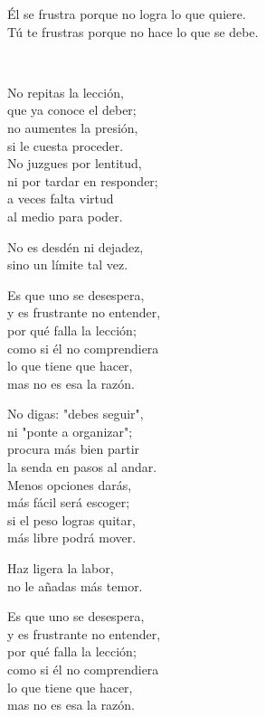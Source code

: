 \begin{lyrics}

Él se frustra porque no logra lo que quiere.\\
Tú te frustras porque no hace lo que se debe.

\\


No repitas la lección,\\
que ya conoce el deber;\\
no aumentes la presión,\\
si le cuesta proceder.\\
No juzgues por lentitud,\\
ni por tardar en responder;\\
a veces falta virtud\\
al medio para poder.


No es desdén ni dejadez,\\
sino un límite tal vez.


Es que uno se desespera,\\
y es frustrante no entender,\\
por qué falla la lección;\\
como si él no comprendiera\\
lo que tiene que hacer,\\
mas no es esa la razón.


No digas: "debes seguir",\\
ni "ponte a organizar";\\
procura más bien partir\\
la senda en pasos al andar.\\
Menos opciones darás,\\
más fácil será escoger;\\
si el peso logras quitar,\\
más libre podrá mover.


Haz ligera la labor,\\
no le añadas más temor.


Es que uno se desespera,\\
y es frustrante no entender,\\
por qué falla la lección;\\
como si él no comprendiera\\
lo que tiene que hacer,\\
mas no es esa la razón.


\end{lyrics}
